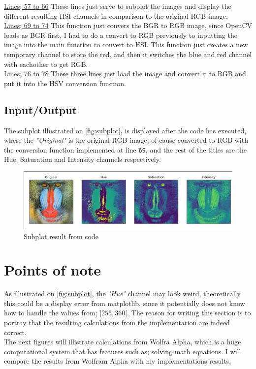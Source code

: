 \documentclass{article}
\begin{document}
\underline{Lines; 57 to 66}
These lines just serve to subplot the images and display the different resulting HSI channels in comparison to the original RGB image.\medskip \\
\underline{Lines; 69 to 74}
This function just convers the BGR to RGB image, since OpenCV loads as BGR first, I had to do a convert to RGB previously to inputting the image into the main function to convert to HSI. This function just creates a new temporary channel to store the red, and then it switches the blue and red channel with eachother to get RGB.\\
\underline{Lines; 76 to 78}
These three lines just load the image and convert it to RGB and put it into the HSV conversion function.\\

\subsection{Input/Output}
The subplot illustrated on \autoref{fig:subplot}, is displayed after the code has executed, where the \textit{"Original"} is the original RGB image, of cause converted to RGB with the conversion function implemented at line \texttt{69}, and the rest of the titles are the Hue, Saturation and Intensity channels respectively.
\begin{figure}[H]
    \centering
    \includegraphics[width=\textwidth]{img/output.png}
    \caption{Subplot result from code}
    \label{fig:subplot}
\end{figure}
\section{Points of note}
As illustrated on \autoref{fig:subplot}, the \textit{"Hue"} channel may look weird, theoretically this could be a display error from matplotlib, since it potentially does not know how to handle the values from; $]255, 360 [$. The reason for writing this section is to portray that the resulting calculations from the implementation are indeed correct.\\
The next figures will illistrate calculations from Wolfra Alpha, which is a huge computational system that has features such as; solving math equations. I will compare the results from Wolfram Alpha with my implementations results.
\end{document}
